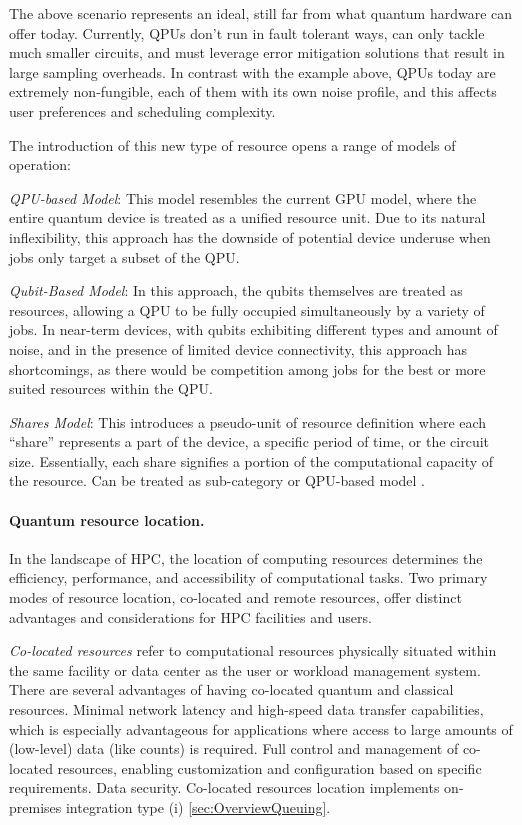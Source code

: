 The above scenario represents an ideal, still far from what quantum hardware can offer today. Currently, QPUs don’t run in fault tolerant ways, can only tackle much smaller circuits, and must leverage error mitigation solutions that result in large sampling overheads. In contrast with the example above, QPUs today are extremely non-fungible, each of them with its own noise profile, and this affects user preferences and scheduling complexity. 

The introduction of this new type of resource opens a range of models of operation:

\textit{QPU-based Model}: This model resembles the current GPU model, where the entire quantum device is treated as a unified resource unit. Due to its natural inflexibility, this approach has the downside of potential device underuse when jobs only target a subset of the QPU.

\textit{Qubit-Based Model}: In this approach, the qubits themselves are treated as resources, allowing a QPU to be fully occupied simultaneously by a variety of jobs. In near-term devices, with qubits exhibiting different types and amount of noise, and in the presence of limited device connectivity, this approach has shortcomings, as there would be competition among jobs for the best or more suited resources within the QPU.

\textit{Shares Model}: This introduces a pseudo-unit of resource definition where each ``share'' represents a part of the device, a specific period of time, or the circuit size. Essentially, each share signifies a portion of the computational capacity of the resource. Can be treated as sub-category or QPU-based model \cite{qiskitRuntimeFairShareAdmin}.




\paragraph{\textbf{Quantum resource location.}}

In the landscape of HPC, the location of computing resources determines the efficiency, performance, and accessibility of computational tasks. Two primary modes of resource location, co-located and remote resources, offer distinct advantages and considerations for HPC facilities and users.



\textit{Co-located resources} refer to computational resources physically situated within the same facility or data center as the user or workload management system. There are several advantages of having co-located quantum and classical resources. Minimal network latency and high-speed data transfer capabilities, which is especially advantageous for applications where access to large amounts of (low-level) data (like counts) is required. Full control and management of co-located resources, enabling customization and configuration based on specific requirements. Data security. Co-located resources location implements on-premises integration type (i) \ref{sec:OverviewQueuing}.


